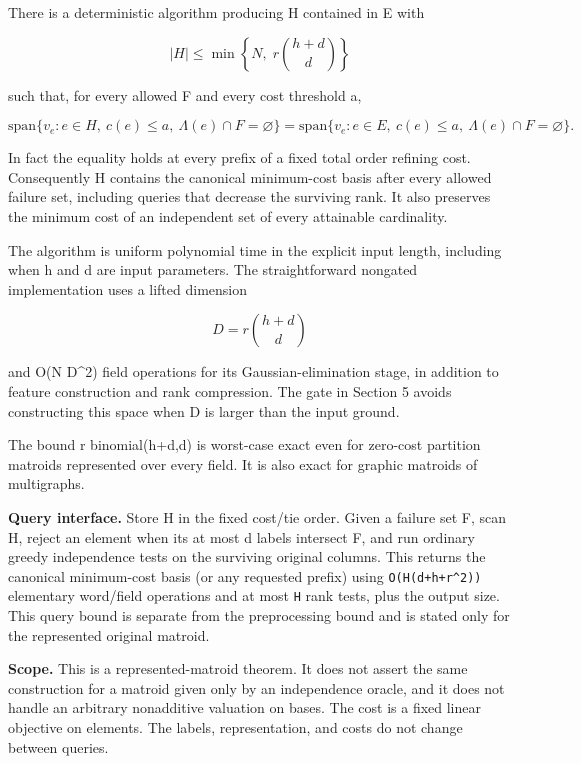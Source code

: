 There is a deterministic algorithm producing H contained in E with

\[
|H|\le \min\left\{N,\;r\binom{h+d}{d}\right\}
 \tag{1}
\]

such that, for every allowed F and every cost threshold a,

\[
\mathrm{span}\{v_e:e\in H,\ c(e)\le a,\ \Lambda(e)\cap F=\varnothing\}
 =
 \mathrm{span}\{v_e:e\in E,\ c(e)\le a,\ \Lambda(e)\cap F=\varnothing\}.
 \tag{2}
\]

In fact the equality holds at every prefix of a fixed total order refining cost. Consequently H contains the canonical minimum-cost basis after every allowed failure set, including queries that decrease the surviving rank. It also preserves the minimum cost of an independent set of every attainable cardinality.

The algorithm is uniform polynomial time in the explicit input length, including when h and d are input parameters. The straightforward nongated implementation uses a lifted dimension

\[
D=r\binom{h+d}{d}
 \tag{3}
\]

and O(N D\^{}2) field operations for its Gaussian-elimination stage, in addition to feature construction and rank compression. The gate in Section 5 avoids constructing this space when D is larger than the input ground.

The bound r binomial(h+d,d) is worst-case exact even for zero-cost partition matroids represented over every field. It is also exact for graphic matroids of multigraphs.

\textbf{Query interface.} Store H in the fixed cost/tie order. Given a failure set F, scan H, reject an element when its at most d labels intersect F, and run ordinary greedy independence tests on the surviving original columns. This returns the canonical minimum-cost basis (or any requested prefix) using \texttt{O(\textbar{}H\textbar{}(d+h+r\^{}2))} elementary word/field operations and at most \texttt{\textbar{}H\textbar{}} rank tests, plus the output size. This query bound is separate from the preprocessing bound and is stated only for the represented original matroid.

\textbf{Scope.} This is a represented-matroid theorem. It does not assert the same construction for a matroid given only by an independence oracle, and it does not handle an arbitrary nonadditive valuation on bases. The cost is a fixed linear objective on elements. The labels, representation, and costs do not change between queries.

